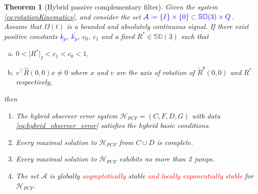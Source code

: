 \documentclass{article}
\newcommand{\SOthree}{\mathbb{SO}(3)}
\newtheorem{theorem}{Theorem}
\newcommand{\brackets}[1]{\left(#1\right)}
\newcommand{\textblue}[1]{\textcolor{blue}{#1}}
\newcommand{\Rtilde}{\tilde{R}}
\newcommand{\normSOthree}[1]{{{\vert}#1 {\vert}_I}}
\newcommand{\Rstar}{{R^*}}
\begin{document}
\begin{theorem}[Hybrid passive complementary filter]\label{theorem:main}
    Given the system \eqref{eq:rotationKinematics}, and consider the set $\textblue{\mathcal{A}\coloneqq \{I\}\times \{0\} \subset \SOthree\times Q}$. Assume that $\Omega(t)$ is a bounded and absolutely continuous signal. If there exist positive constants \textblue{$k_p$, $\overline{k_p}$}, $c_0$, $c_1$ and a fixed $R^*\in\SOthree$ such that %
        \begin{enumerate}[(a)]
        \item $0 < \normSOthree{\Rstar} < c_1 < c_0 < 1$,\label{item:a-bullet}
        \item {${v}^\top \hat{R}(0,0)x\neq 0$ where $x$ and $v$ are the axis of rotation of $\Rtilde^y(0,0)$ and $R^*$ respectively}, \label{item:b-bullet}
        \end{enumerate}
    \begingroup
    \renewcommand\labelenumi{(\theenumi)}
    then
    \begin{enumerate}
        \item \label{(1)}The hybrid observer error system $\mathcal{H}_{PCF} = (C, F, D, G)$ with data \eqref{eq:hybrid_observer_error} satisfies the hybrid basic conditions.
        \item \label{(2)}Every maximal solution to $\mathcal{H}_{PCF}$ from $C\cup D$ is complete.
        \item \label{(3)} Every maximal solution to $\mathcal{H}_{PCF}$ exhibits no more than 2 jumps. 
        \item \label{(4)}The set $\mathcal{A}$ is globally \textcolor{red}{asymptotically} stable \textcolor{red}{and locally exponentially stable }for $\mathcal{H}_{PCF}$. 
    \end{enumerate}
    \endgroup
    \end{theorem}
\end{document}
